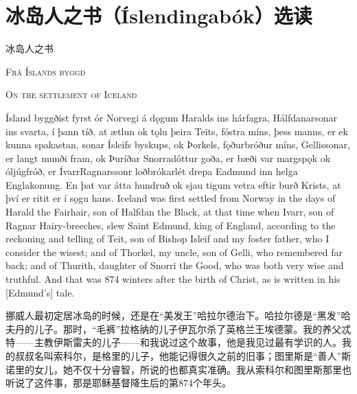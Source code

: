 \section{冰岛人之书（Íslendingabók）选读}
冰岛人之书
\begin{paracol}{2}
    \begin{center}
        \textsc{Frá Íslands byggð}
    \end{center}

    \switchcolumn
    \begin{center}
        \textsc{On the settlement of Iceland}
    \end{center}
    \switchcolumn*
    Ísland byggðist fyrst ór Norvegi á dǫgum Haralds ins hárfagra\footnotemark, Hálfdanarsonar ins svarta\footnotemark, í þann tíð, at ætlun ok tǫlu þeira Teits, fóstra míns, þess manns, er ek kunna spakastan, sonar Ísleifs byskups, ok Þorkels, fǫðurbróður míns, Gellissonar, er langt munði fram, ok Þuríðar Snorradóttur goða, er bæði var margspǫk ok óljúgfróð, er Ívarr\footnotemark Ragnarssonr loðbrókar\footnotemark lét drepa Eadmund inn helga Englakonung\footnotemark. En þat var átta hundruð ok sjau tigum vetra eftir burð Krists, at því er ritit er í sǫgu hans.
    \switchcolumn
    Iceland was first settled from Norway in the days of Harald the Fairhair, son of Halfdan the Black, at that time when Ivarr, son of Ragnar Hairy-breeches, slew Saint Edmund, king of England, according to the reckoning and telling of Teit, son of Bishop Isleif and my foster father, who I consider the wisest; and of Thorkel, my uncle, son of Gelli, who remembered far back; and of Thurith, daughter of Snorri the Good, who was both very wise and truthful. And that was 874 winters after the birth of Christ, as is written in his [Edmund's] tale.
\end{paracol}
\begin{translation*}{}
    挪威人最初定居冰岛的时候，还是在“美发王”哈拉尔德治下。哈拉尔德是“黑发”哈夫丹的儿子。那时，“毛裤”拉格纳的儿子伊瓦尔杀了英格兰王埃德蒙。我的养父忒特——主教伊斯雷夫的儿子——和我说过这个故事，他是我见过最有学识的人。我的叔叔名叫索科尔，是格里的儿子，他能记得很久之前的旧事；图里斯是“善人”斯诺里的女儿，她不仅十分睿智，所说的也都真实准确。我从索科尔和图里斯那里也听说了这件事，那是耶稣基督降生后的第874个年头。
\end{translation*}
